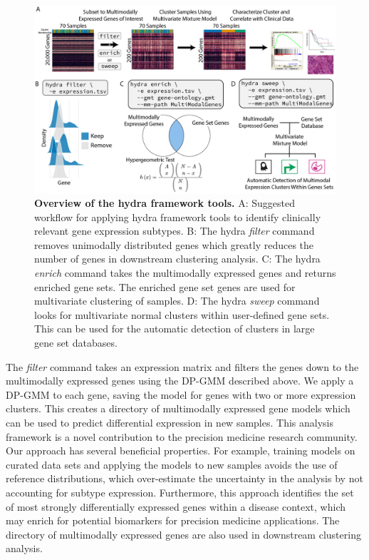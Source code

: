 \documentclass[10pt,letterpaper]{article}
\providecommand{\DIFaddbegin}{} %
\providecommand{\DIFaddbeginFL}{} %
\providecommand{\DIFaddendFL}{} %
\newcommand{\DIFaddincludegraphics}[2][]{{\color{blue}\fbox{\DIFOincludegraphics[#1]{#2}}}} %
\DeclareRobustCommand{\DIFaddbegin}{\DIFOaddbegin \let\includegraphics\DIFaddincludegraphics} %
\DeclareRobustCommand{\DIFaddbeginFL}{\DIFOaddbeginFL \let\includegraphics\DIFaddincludegraphics} %
\DeclareRobustCommand{\DIFaddendFL}{\DIFOaddendFL \let\includegraphics\DIFOincludegraphics} %
\begin{document}
\begin{figure}[h!]
	\DIFaddbeginFL \includegraphics[width=\textwidth]{"img/PNG/overview-fig"}
	\DIFaddendFL \caption{{\bf Overview of the hydra framework tools.}
		A: Suggested workflow for applying hydra framework tools to identify clinically relevant gene expression subtypes. B: The hydra \textit{filter} command removes unimodally distributed genes which greatly reduces the number of genes in downstream clustering analysis. C: The hydra \textit{enrich} command takes the multimodally expressed genes and returns enriched gene sets. The enriched gene set genes are used for multivariate clustering of samples. D: The hydra 
	    \textit{sweep} command looks for multivariate normal clusters within user-defined gene sets. This can be used for the automatic detection of clusters in large gene set databases.
		\label{overview}}
\end{figure}

The \textit{filter} command takes an expression matrix and filters the genes down to the multimodally expressed genes using the DP-GMM described above. We apply a DP-GMM to each gene, saving the model for genes with two or more expression clusters. This creates a directory of multimodally expressed gene models which can be used to predict differential expression in new samples. This analysis framework is a novel contribution to the precision medicine research community. Our approach has several beneficial properties. For example, training models on curated data sets and applying the models to new samples avoids the use of reference distributions, which over-estimate the uncertainty in the analysis by not accounting for subtype expression. Furthermore, this approach identifies the set of most strongly differentially expressed genes within a disease context, which may enrich for potential biomarkers for precision medicine applications. The directory of multimodally expressed genes are also used in downstream clustering analysis. 
\DIFaddbegin 
\end{document}
